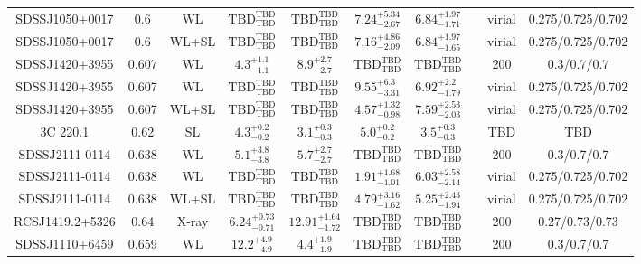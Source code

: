 \begin{table}
\begin{tabular}{cccccccccc}
SDSSJ1050+0017 & 0.6 & WL & ${\mathrm{TBD}}^{\mathrm{TBD}}_{\mathrm{TBD}}$ & ${\mathrm{TBD}}^{\mathrm{TBD}}_{\mathrm{TBD}}$ & ${7.24}^{+5.34}_{-2.67}$ & ${6.84}^{+1.97}_{-1.71}$ & \citet{OG12.1} & virial & 0.275/0.725/0.702 \\
SDSSJ1050+0017 & 0.6 & WL+SL & ${\mathrm{TBD}}^{\mathrm{TBD}}_{\mathrm{TBD}}$ & ${\mathrm{TBD}}^{\mathrm{TBD}}_{\mathrm{TBD}}$ & ${7.16}^{+4.86}_{-2.09}$ & ${6.84}^{+1.97}_{-1.65}$ & \citet{OG12.1} & virial & 0.275/0.725/0.702 \\
SDSSJ1420+3955 & 0.607 & WL & ${4.3}^{+1.1}_{-1.1}$ & ${8.9}^{+2.7}_{-2.7}$ & ${\mathrm{TBD}}^{\mathrm{TBD}}_{\mathrm{TBD}}$ & ${\mathrm{TBD}}^{\mathrm{TBD}}_{\mathrm{TBD}}$ & \citet{SE14.1} & 200 & 0.3/0.7/0.7 \\
SDSSJ1420+3955 & 0.607 & WL & ${\mathrm{TBD}}^{\mathrm{TBD}}_{\mathrm{TBD}}$ & ${\mathrm{TBD}}^{\mathrm{TBD}}_{\mathrm{TBD}}$ & ${9.55}^{+6.3}_{-3.31}$ & ${6.92}^{+2.2}_{-1.79}$ & \citet{OG12.1} & virial & 0.275/0.725/0.702 \\
SDSSJ1420+3955 & 0.607 & WL+SL & ${\mathrm{TBD}}^{\mathrm{TBD}}_{\mathrm{TBD}}$ & ${\mathrm{TBD}}^{\mathrm{TBD}}_{\mathrm{TBD}}$ & ${4.57}^{+1.32}_{-0.98}$ & ${7.59}^{+2.53}_{-2.03}$ & \citet{OG12.1} & virial & 0.275/0.725/0.702 \\
3C 220.1 & 0.62 & SL & ${4.3}^{+0.2}_{-0.2}$ & ${3.1}^{+0.3}_{-0.3}$ & ${5.0}^{+0.2}_{-0.2}$ & ${3.5}^{+0.3}_{-0.3}$ & \citet{CO07.1} & TBD & TBD \\
SDSSJ2111-0114 & 0.638 & WL & ${5.1}^{+3.8}_{-3.8}$ & ${5.7}^{+2.7}_{-2.7}$ & ${\mathrm{TBD}}^{\mathrm{TBD}}_{\mathrm{TBD}}$ & ${\mathrm{TBD}}^{\mathrm{TBD}}_{\mathrm{TBD}}$ & \citet{SE14.1} & 200 & 0.3/0.7/0.7 \\
SDSSJ2111-0114 & 0.638 & WL & ${\mathrm{TBD}}^{\mathrm{TBD}}_{\mathrm{TBD}}$ & ${\mathrm{TBD}}^{\mathrm{TBD}}_{\mathrm{TBD}}$ & ${1.91}^{+1.68}_{-1.01}$ & ${6.03}^{+2.58}_{-2.14}$ & \citet{OG12.1} & virial & 0.275/0.725/0.702 \\
SDSSJ2111-0114 & 0.638 & WL+SL & ${\mathrm{TBD}}^{\mathrm{TBD}}_{\mathrm{TBD}}$ & ${\mathrm{TBD}}^{\mathrm{TBD}}_{\mathrm{TBD}}$ & ${4.79}^{+3.16}_{-1.62}$ & ${5.25}^{+2.43}_{-1.94}$ & \citet{OG12.1} & virial & 0.275/0.725/0.702 \\
RCSJ1419.2+5326 & 0.64 & X-ray & ${6.24}^{+0.73}_{-0.71}$ & ${12.91}^{+1.64}_{-1.72}$ & ${\mathrm{TBD}}^{\mathrm{TBD}}_{\mathrm{TBD}}$ & ${\mathrm{TBD}}^{\mathrm{TBD}}_{\mathrm{TBD}}$ & \citet{BA14.1} & 200 & 0.27/0.73/0.73 \\
SDSSJ1110+6459 & 0.659 & WL & ${12.2}^{+4.9}_{-4.9}$ & ${4.4}^{+1.9}_{-1.9}$ & ${\mathrm{TBD}}^{\mathrm{TBD}}_{\mathrm{TBD}}$ & ${\mathrm{TBD}}^{\mathrm{TBD}}_{\mathrm{TBD}}$ & \citet{SE14.1} & 200 & 0.3/0.7/0.7 \\

\end{tabular}
\end{table}
